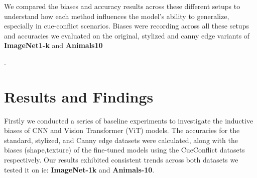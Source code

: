 \documentclass{article}
\begin{document}
We compared the biases and accuracy results across these different setups to understand how each method influences the model's ability to generalize, especially in cue-conflict scenarios. Biases were recording across all these setups and accuracies we evaluated on the original, stylized and canny edge variants of \textbf{ImageNet1-k} and \textbf{Animals10}

.

\section{Results and Findings}

Firstly we conducted a series of baseline experiments to investigate the inductive biases of CNN and Vision Transformer (ViT) models. The accuracies for the standard, stylized, and Canny edge datasets were calculated, along with the biases (shape,texture) of the fine-tuned models using the CueConflict datasets respectively. Our results exhibited consistent trends across both datasets we tested it on ie: \textbf{ImageNet-1k} and \textbf{Animals-10}.
\end{document}

